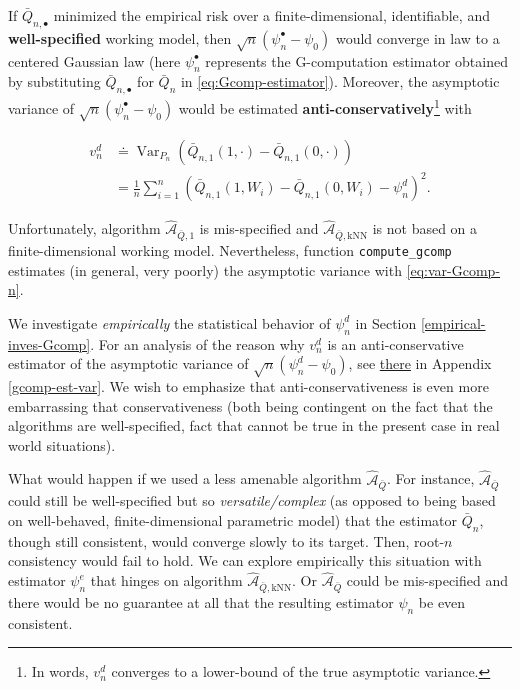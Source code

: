 \documentclass[11pt,openright,twoside]{book}
\DeclareMathOperator{\Var}{Var}
\newcommand{\Algo}{\widehat{\mathcal{A}}}
\newcommand{\defq}{\doteq}
\newcommand{\Qbar}{\bar{Q}}
\theoremstyle{definition}
\theoremstyle{definition}
\theoremstyle{definition}
\theoremstyle{remark}
\begin{document}
If \(\Qbar_{n,\bullet}\) minimized the empirical risk over a
finite-dimensional, identifiable, and \textbf{well-specified} working model, then
\(\sqrt{n} (\psi_{n}^{\bullet} - \psi_{0})\) would converge in law to a
centered Gaussian law (here \(\psi_{n}^{\bullet}\) represents the G-computation
estimator obtained by substituting \(\Qbar_{n,\bullet}\) for \(\Qbar_{n}\) in
\eqref{eq:Gcomp-estimator}). Moreover, the asymptotic
variance of \(\sqrt{n} (\psi_{n}^{\bullet} - \psi_{0})\) would be estimated
\textbf{anti-conservatively}\footnote{In words, \(v_{n}^{d}\) converges to a lower-bound of
  the true asymptotic variance.} with

\begin{align} 
v_{n}^{d}            &\defq            \Var_{P_{n}}
\left(\Qbar_{n,1}(1,\cdot) - \Qbar_{n,1}(0,\cdot)\right) \\ &= \frac{1}{n}
\sum_{i=1}^{n}\left(\Qbar_{n,1}(1,W_{i})         -        \Qbar_{n,1}(0,W_{i})
-\psi_{n}^{d}\right)^{2}.  \label{eq:var-Gcomp-n} 
\end{align}

Unfortunately, algorithm \(\Algo_{\Qbar,1}\) is mis-specified and
\(\Algo_{\Qbar,\text{kNN}}\) is not based on a finite-dimensional working
model. Nevertheless, function \texttt{compute\_gcomp} estimates (in general, very
poorly) the asymptotic variance with \eqref{eq:var-Gcomp-n}.

We investigate \emph{empirically} the statistical behavior of \(\psi_{n}^{d}\) in
Section \ref{empirical-inves-Gcomp}. For an analysis of the reason why
\(v_{n}^{d}\) is an anti-conservative estimator of the asymptotic variance of
\(\sqrt{n} (\psi_{n}^{d} - \psi_{0})\), see \protect\hyperlink{gcomp-est-var}{there} in Appendix
\ref{gcomp-est-var}. We wish to emphasize that anti-conservativeness is even
more embarrassing that conservativeness (both being contingent on the fact
that the algorithms are well-specified, fact that cannot be true in the
present case in real world situations).

What would happen if we used a less amenable algorithm \(\Algo_{\Qbar}\). For
instance, \(\Algo_{\Qbar}\) could still be well-specified but so
\emph{versatile/complex} (as opposed to being based on well-behaved,
finite-dimensional parametric model) that the estimator \(\Qbar_{n}\), though
still consistent, would converge slowly to its target. Then, root-\(n\)
consistency would fail to hold. We can explore empirically this situation
with estimator \(\psi_{n}^{e}\) that hinges on algorithm
\(\Algo_{\Qbar,\text{kNN}}\). Or \(\Algo_{\Qbar}\) could be
mis-specified and there would be no guarantee at all
that the resulting estimator \(\psi_{n}\) be even consistent.
\end{document}
